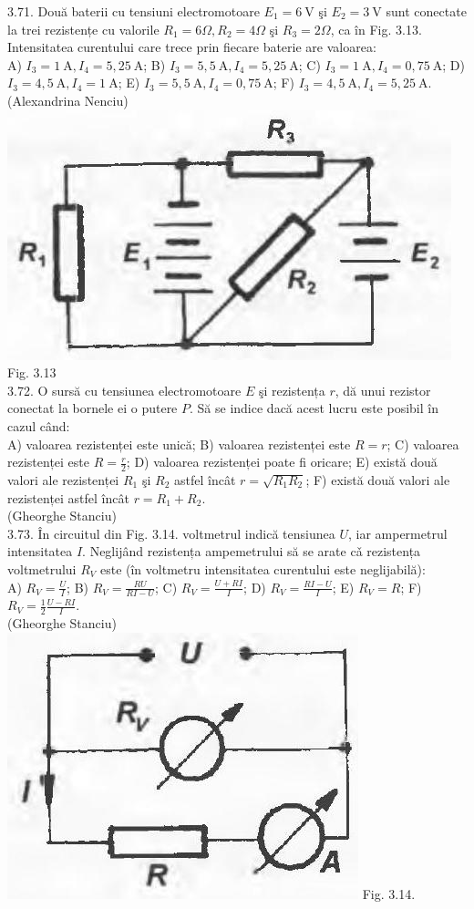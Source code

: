 3.71. Două baterii cu tensiuni electromotoare $E_{1}=6 \mathrm{~V}$ şi $E_{2}=3 \mathrm{~V}$ sunt conectate la trei rezistențe cu valorile $R_{1}=6 \Omega, R_{2}=4 \Omega$ şi $R_{3}=2 \Omega$, ca în Fig. 3.13. Intensitatea curentului care trece prin fiecare baterie are valoarea:\\ A) $I_{3}=1 \mathrm{~A}, I_{4}=5,25 \mathrm{~A}$; B) $I_{3}=5,5 \mathrm{~A}, I_{4}=5,25 \mathrm{~A}$; C) $I_{3}=1 \mathrm{~A}, I_{4}=0,75 \mathrm{~A}$; D) $I_{3}=4,5 \mathrm{~A}, I_{4}=1 \mathrm{~A}$; E) $I_{3}=5,5 \mathrm{~A}, I_{4}=0,75 \mathrm{~A}$; F) $I_{3}=4,5 \mathrm{~A}, I_{4}=5,25 \mathrm{~A}$.\\ (Alexandrina Nenciu)\\ \includegraphics[width=0.4\linewidth]{images/2025_07_01_5b3ff9fa0d508c8e9f17g-159(2)} Fig. 3.13\\

3.72. O sursă cu tensiunea electromotoare $E$ şi rezistența $r$, dă unui rezistor conectat la bornele ei o putere $P$. Să se indice dacă acest lucru este posibil în cazul când:\\ A) valoarea rezistenței este unică; B) valoarea rezistenței este $R=r$; C) valoarea rezistenței este $R=\frac{r}{2}$; D) valoarea rezistenței poate fi oricare; E) există două valori ale rezistenței $R_{1}$ şi $R_{2}$ astfel încât $r=\sqrt{R_{1} R_{2}}$; F) există două valori ale rezistenței astfel încât $r=R_{1}+R_{2}$.\\ (Gheorghe Stanciu)\\

3.73. În circuitul din Fig. 3.14. voltmetrul indică tensiunea $U$, iar ampermetrul intensitatea $I$. Neglijând rezistența ampemetrului să se arate cǎ rezistența voltmetrului $R_{V}$ este (în voltmetru intensitatea curentului este neglijabilă):\\ A) $R_{V}=\frac{U}{I}$; B) $R_{V}=\frac{R U}{R I-U}$; C) $R_{V}=\frac{U+R I}{I}$; D) $R_{V}=\frac{R I-U}{I}$; E) $R_{V}=R$; F) $R_{V}=\frac{1}{2} \frac{U-R I}{I}$.\\ (Gheorghe Stanciu)\\ \includegraphics[width=0.4\linewidth]{images/2025_07_01_5b3ff9fa0d508c8e9f17g-159(1)} Fig. 3.14.\\


